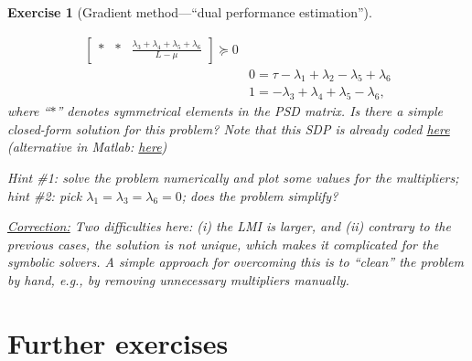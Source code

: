 \documentclass[11pt,a4paper]{article}
\newcommand{\correction}[1]{{{\color{blue}\underline{Correction:} #1}}}
\newcommand{\correction}[1]{}
\newtheorem{exercise}{Exercise}
\begin{document}
\begin{exercise}[Gradient method---``dual performance estimation'']
\begin{enumerate}
{\begin{equation}
\begin{aligned}
\begin{bmatrix}
	* & * & \frac{\lambda_3+\lambda_4+\lambda_5+\lambda_6}{L-\mu }
	\end{bmatrix}\succcurlyeq 0\\
	&0=\tau-\lambda_1+\lambda_2-\lambda_5+\lambda_6\\
	&1=-\lambda_3+\lambda_4+\lambda_5-\lambda_6,
	\end{aligned}
	\end{equation}}where ``$*$'' denotes symmetrical elements in the PSD matrix. Is there a simple closed-form solution for this problem? Note that this SDP is already coded \href{https://github.com/PerformanceEstimation/Learning-Performance-Estimation/tree/main/Exercises - codes/Jupyter/Exercise1.ipynb}{here} (alternative in Matlab: \href{https://github.com/PerformanceEstimation/Learning-Performance-Estimation/blob/main/Exercises - codes/Matlab/Exercise1_SDP_functionvalues.m}{here})
	
	Hint \#1: solve the problem numerically and plot some values for the multipliers; hint \#2: pick $\lambda_1=\lambda_3=\lambda_6=0$; does the problem simplify?
	
	\correction{ Two difficulties here: (i) the LMI is larger, and (ii) contrary to the previous cases, the solution is not unique, which makes it complicated for the symbolic solvers. A simple approach for overcoming this is to ``clean'' the problem by hand, e.g., by removing unnecessary multipliers manually.}
	\end{enumerate}
	\end{exercise}
	
	
	\section{Further exercises}\label{s:exo}		%
		
\end{document}
